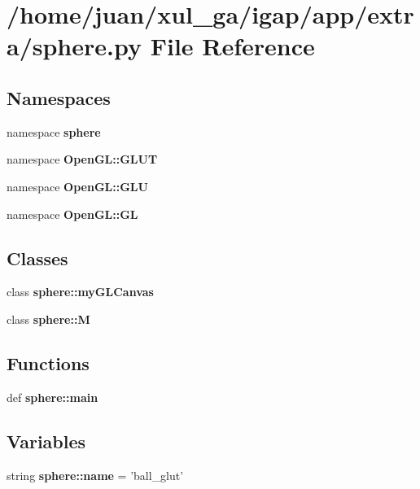 \section{/home/juan/xul\_\-ga/igap/app/extra/sphere.py File Reference}
\label{sphere_8py}
\subsection*{Namespaces}
\begin{CompactItemize}
\item 
namespace {\bf sphere}
\item 
namespace {\bf OpenGL::GLUT}
\item 
namespace {\bf OpenGL::GLU}
\item 
namespace {\bf OpenGL::GL}
\end{CompactItemize}
\subsection*{Classes}
\begin{CompactItemize}
\item 
class {\bf sphere::myGLCanvas}
\item 
class {\bf sphere::M}
\end{CompactItemize}
\subsection*{Functions}
\begin{CompactItemize}
\item 
def {\bf sphere::main}
\end{CompactItemize}
\subsection*{Variables}
\begin{CompactItemize}
\item 
string {\bf sphere::name} = 'ball\_\-glut'
\end{CompactItemize}

